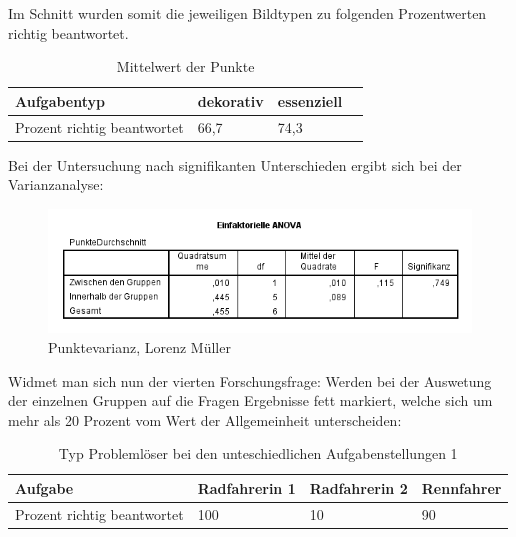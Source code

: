Im Schnitt wurden somit die jeweiligen Bildtypen zu folgenden Prozentwerten richtig beantwortet. 

\begin{table}[!h]
\hspace{-5pt}
\begin{tabularx}{\textwidth + 5pt}{| @{\hspace{3pt}} M || @{\hspace{3pt}} M  | @{\hspace{3pt}} M | @{\hspace{3pt}} M |}
\hline
\textbf{Aufgabentyp} & \textbf{dekorativ} & \textbf{essenziell} \\
\hline
\hline
Prozent richtig beantwortet       & 66,7 & 74,3 \\
\hline
\end{tabularx}
\caption{Mittelwert der Punkte}
\end{table}

Bei der Untersuchung nach signifikanten Unterschieden ergibt sich bei der Varianzanalyse:


\begin{figure}[!ht]
\noindent\hspace{0.5mm}\includegraphics[width=15cm]{./Ressourcen/Aufgabenuntescheidung.png}
\caption{Punktevarianz, Lorenz Müller}
\end{figure}




Widmet man sich nun der vierten Forschungsfrage:
Werden bei der Auswetung der einzelnen Gruppen auf die Fragen Ergebnisse fett markiert, welche sich um mehr als 20 Prozent vom Wert der Allgemeinheit unterscheiden:

\begin{table}[!h]
\hspace{-5pt}
\begin{tabularx}{\textwidth + 5pt}{| @{\hspace{3pt}} M || @{\hspace{3pt}} M  | @{\hspace{3pt}} M | @{\hspace{3pt}} M |}
\hline
\textbf{Aufgabe} & \textbf{Radfahrerin 1} & \textbf{Radfahrerin 2} & \textbf{Rennfahrer} \\
\hline
\hline
Prozent richtig beantwortet       & 100 & 10 & 90 \\
\hline
\end{tabularx}
\caption{Typ Problemlöser bei den unteschiedlichen Aufgabenstellungen 1}
\end{table}


